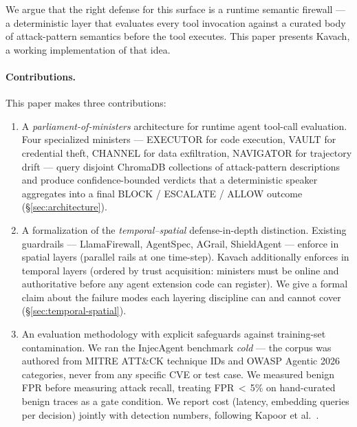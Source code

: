 \documentclass[11pt]{article}
\begin{document}
We argue that the right defense for this surface is a runtime semantic
firewall — a deterministic layer that evaluates every tool invocation
against a curated body of attack-pattern semantics before the tool executes.
This paper presents Kavach, a working implementation of that idea.

\paragraph{Contributions.} This paper makes three contributions:
\begin{enumerate}
    \item A \emph{parliament-of-ministers} architecture for runtime agent
          tool-call evaluation. Four specialized ministers — EXECUTOR for
          code execution, VAULT for credential theft, CHANNEL for data
          exfiltration, NAVIGATOR for trajectory drift — query disjoint
          ChromaDB collections of attack-pattern descriptions and produce
          confidence-bounded verdicts that a deterministic speaker
          aggregates into a final BLOCK / ESCALATE / ALLOW outcome
          (\S\ref{sec:architecture}).

    \item A formalization of the \emph{temporal--spatial} defense-in-depth
          distinction. Existing guardrails — LlamaFirewall, AgentSpec, AGrail,
          ShieldAgent — enforce in spatial layers (parallel rails at one
          time-step). Kavach additionally enforces in temporal layers
          (ordered by trust acquisition: ministers must be online and
          authoritative before any agent extension code can register).
          We give a formal claim about the failure modes each layering
          discipline can and cannot cover (\S\ref{sec:temporal-spatial}).

    \item An evaluation methodology with explicit safeguards against
          training-set contamination. We ran the InjecAgent benchmark
          \emph{cold} — the corpus was authored from MITRE ATT\&CK technique
          IDs and OWASP Agentic 2026 categories, never from any specific CVE
          or test case. We measured benign FPR before measuring attack
          recall, treating FPR\,$<$\,5\% on hand-curated benign traces as a
          gate condition. We report cost (latency, embedding queries per
          decision) jointly with detection numbers, following Kapoor et
          al.~\cite{kapoor2024aiagents}.
\end{enumerate}
\end{document}
